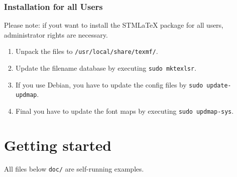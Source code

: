 \documentclass{scrartcl}
\newcommand{\stmlatex}{STM\LaTeX\xspace}
\begin{document}
\subsubsection{Installation for all Users}
Please note: if yout want to install the \stmlatex package for all users, administrator rights are necessary.
\begin{enumerate}
  \item Unpack the files to \texttt{/usr/local/share/texmf/}.
  \item Update the filename database by executing \texttt{sudo mktexlsr}.
  \item If you use Debian, you have to update the config files by \texttt{sudo update-updmap}.
  \item Final you have to update the font maps by executing \texttt{sudo updmap-sys}.
\end{enumerate}

\section{Getting started}

All files below \texttt{doc/} are self-running examples.
\end{document}
